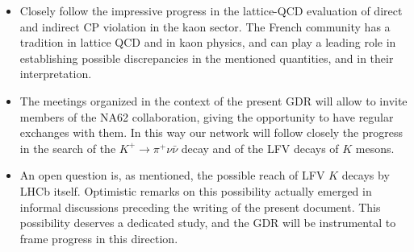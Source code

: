 \begin{itemize}

\item Closely follow the impressive progress in the lattice-QCD evaluation of direct and indirect CP violation in the kaon sector. The French community has a tradition in lattice QCD and in kaon physics, and can play a leading role in establishing possible discrepancies in the mentioned quantities, and in their interpretation.

\item The meetings organized in the context of the present GDR will allow to invite  members of the NA62 collaboration, giving the opportunity to have regular exchanges with them. In this way our network will  follow closely the progress in the search of the $K^+ \to \pi^+ \nu \bar \nu$ decay and of the LFV decays of $K$ mesons.

\item An open question is, as mentioned, the possible reach of LFV $K$ decays by LHCb itself. Optimistic remarks on this possibility actually emerged in informal discussions  preceding the writing of the present document. This possibility deserves a dedicated study, and the GDR will be instrumental to frame progress in this direction.

\end{itemize}



